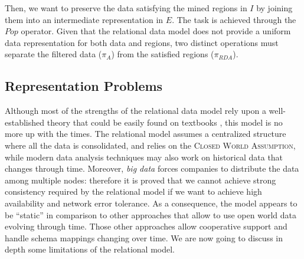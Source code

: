Then, we want to preserve the data satisfying the mined regions in $I$ by joining them into an intermediate representation in $E$. The task is achieved through the $Pop$ operator. Given that the relational data model does not provide a uniform data representation for both data and regions, two distinct operations must separate the filtered data ($\pi_A$) from the satisfied regions ($\pi_{RDA}$).

\subsection{Representation Problems}\label{sec:relreprprob}
Although most of the strengths of the relational data model rely upon a well-established theory \cite{Codd} that could be easily found on textbooks \cite{Garcia-Molina}, this model is no more up with the times. The relational model assumes a centralized structure where all the data is consolidated, and relies on the \textsc{Closed World Assumption}, while modern data analysis techniques may also work on historical data that changes through time. Moreover, \textit{big data} forces companies to distribute the data among multiple nodes: therefore it is proved \cite{Gilbert02} that we cannot achieve strong consistency required by the relational model if we want to achieve high availability and network error tolerance. As a consequence, the model appears to be ``static'' \cite{Badia} in comparison to other approaches that allow to use open world data evolving through time. Those other approaches allow cooperative support \cite{Aligon201520} and  handle schema mappings changing over time.  We are now going to discuss in depth some limitations of the relational model.


